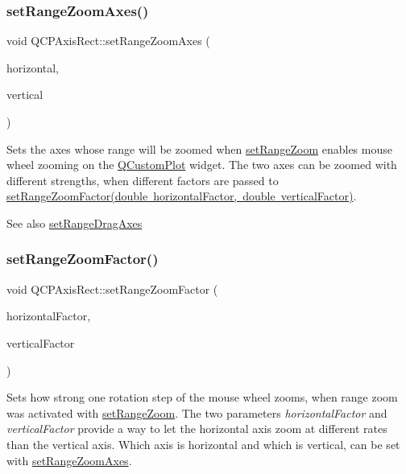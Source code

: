 \subsubsection{\texorpdfstring{set\+Range\+Zoom\+Axes()}{setRangeZoomAxes()}}
{\footnotesize\ttfamily void Q\+C\+P\+Axis\+Rect\+::set\+Range\+Zoom\+Axes (\begin{DoxyParamCaption}\item[{\mbox{\hyperlink{class_q_c_p_axis}{Q\+C\+P\+Axis}} $\ast$}]{horizontal,  }\item[{\mbox{\hyperlink{class_q_c_p_axis}{Q\+C\+P\+Axis}} $\ast$}]{vertical }\end{DoxyParamCaption})}

Sets the axes whose range will be zoomed when \mbox{\hyperlink{class_q_c_p_axis_rect_a7960a9d222f1c31d558b064b60f86a31}{set\+Range\+Zoom}} enables mouse wheel zooming on the \mbox{\hyperlink{class_q_custom_plot}{Q\+Custom\+Plot}} widget. The two axes can be zoomed with different strengths, when different factors are passed to \mbox{\hyperlink{class_q_c_p_axis_rect_a895d7ac745ea614e04056244b3c138ac}{set\+Range\+Zoom\+Factor(double horizontal\+Factor, double vertical\+Factor)}}.

\begin{DoxySeeAlso}{See also}
\mbox{\hyperlink{class_q_c_p_axis_rect_a648cce336bd99daac4a5ca3e5743775d}{set\+Range\+Drag\+Axes}} 
\end{DoxySeeAlso}
\mbox{\label{class_q_c_p_axis_rect_a895d7ac745ea614e04056244b3c138ac}} 
\subsubsection{\texorpdfstring{set\+Range\+Zoom\+Factor()}{setRangeZoomFactor()}\hspace{0.1cm}{\footnotesize\ttfamily [1/2]}}
{\footnotesize\ttfamily void Q\+C\+P\+Axis\+Rect\+::set\+Range\+Zoom\+Factor (\begin{DoxyParamCaption}\item[{double}]{horizontal\+Factor,  }\item[{double}]{vertical\+Factor }\end{DoxyParamCaption})}

Sets how strong one rotation step of the mouse wheel zooms, when range zoom was activated with \mbox{\hyperlink{class_q_c_p_axis_rect_a7960a9d222f1c31d558b064b60f86a31}{set\+Range\+Zoom}}. The two parameters {\itshape horizontal\+Factor} and {\itshape vertical\+Factor} provide a way to let the horizontal axis zoom at different rates than the vertical axis. Which axis is horizontal and which is vertical, can be set with \mbox{\hyperlink{class_q_c_p_axis_rect_a9442cca2aa358405f39a64d51eca13d2}{set\+Range\+Zoom\+Axes}}.

